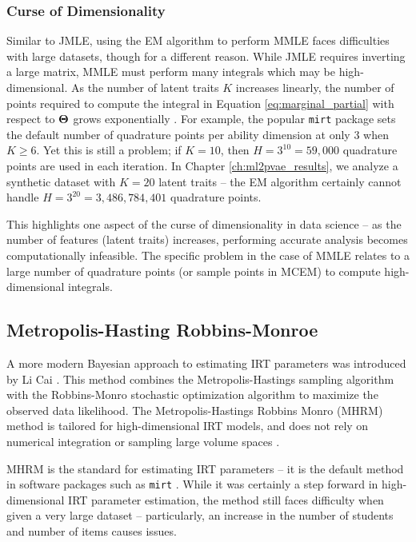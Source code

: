 \subsubsection{Curse of Dimensionality} \label{sec:dim}
Similar to JMLE, using the EM algorithm to perform MMLE faces difficulties with large datasets, though for a different reason. While JMLE requires inverting a large matrix, MMLE must perform many integrals which may be high-dimensional. As the number of latent traits $K$ increases linearly, the number of points required to compute the integral in Equation \ref{eq:marginal_partial} with respect to $\boldsymbol{\Theta}$ grows exponentially \cite{cai2010}. For example, the popular \verb!mirt! package \cite{mirt} sets the default number of quadrature points per ability dimension at only $3$ when $K\geq6$. Yet this is still a problem; if $K=10$, then $H = 3^{10} = 59,000$ quadrature points are used in each iteration. In Chapter \ref{ch:ml2pvae_results}, we analyze a synthetic dataset with $K=20$ latent traits -- the EM algorithm certainly cannot handle $H=3^{20} = 3,486,784,401$ quadrature points.

This highlights one aspect of the curse of dimensionality in data science -- as the number of features (latent traits) increases, performing accurate analysis becomes computationally infeasible. The specific problem in the case of MMLE relates to a large number of quadrature points (or sample points in MCEM) to compute high-dimensional integrals.


\subsection{Metropolis-Hasting Robbins-Monroe}
A more modern Bayesian approach to estimating IRT parameters was introduced by Li Cai \cite{cai2009} \cite{cai2010}. This method combines the Metropolis-Hastings sampling algorithm \cite{hastings1970} with the Robbins-Monro stochastic optimization algorithm \cite{robbins1951} to maximize the observed data likelihood. The Metropolis-Hastings Robbins Monro (MHRM) method is tailored for high-dimensional IRT models, and does not rely on numerical integration or sampling large volume spaces \cite{han2014}. 

MHRM is the standard for estimating IRT parameters -- it is the default method in software packages such as \verb!mirt! \cite{mirt}. While it was certainly a step forward in high-dimensional IRT parameter estimation, the method still faces difficulty when given a very large dataset -- particularly, an increase in the number of students and number of items causes issues.   

